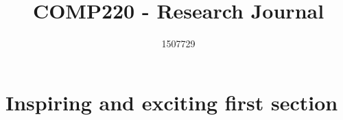 \documentclass{scrartcl}
\title{COMP220 - Research Journal}
\author{1507729}
\begin{document}
\maketitle

\section{Inspiring and exciting first section}





\end{document}

